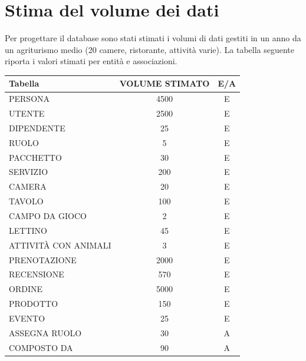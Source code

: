 \documentclass[a4paper,12pt]{report}
\begin{document}
\section{Stima del volume dei dati}
Per progettare il database sono stati stimati i volumi di dati gestiti in un anno da un agriturismo
medio (20 camere, ristorante, attività varie). La tabella seguente riporta i valori stimati per entità
e associazioni.
\begin{table}[H]
	\centering
	\small
	\renewcommand{\arraystretch}{1.15}
	\begin{tabularx}{\textwidth}{|X|c|c|}
		\hline
		\rowcolor{gray!20}
		\textbf{Tabella}      & \textbf{VOLUME STIMATO} & \textbf{E/A} \\
		\hline
		PERSONA               & 4500                    & E            \\
		UTENTE                & 2500                    & E            \\
		DIPENDENTE            & 25                      & E            \\
		RUOLO                 & 5                       & E            \\
		PACCHETTO             & 30                      & E            \\
		SERVIZIO              & 200                     & E            \\
		CAMERA                & 20                      & E            \\
		TAVOLO                & 100                     & E            \\
		CAMPO DA GIOCO        & 2                       & E            \\
		LETTINO               & 45                      & E            \\
		ATTIVITÀ CON ANIMALI  & 3                       & E            \\
		PRENOTAZIONE          & 2000                    & E            \\
		RECENSIONE            & 570                     & E            \\
		ORDINE                & 5000                    & E            \\
		PRODOTTO              & 150                     & E            \\
		EVENTO                & 25                      & E            \\
		ASSEGNA RUOLO         & 30                      & A            \\
		COMPOSTO DA           & 90                      & A            \\

\end{tabularx}
\end{table}
\end{document}
